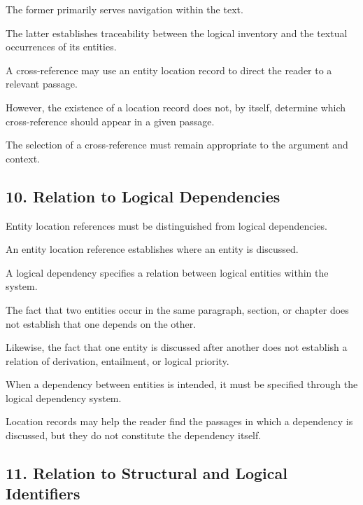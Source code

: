 The former primarily serves
navigation within the text.

The latter establishes
traceability between the
logical inventory and the
textual occurrences of
its entities.

A cross-reference may use
an entity location record
to direct the reader to
a relevant passage.

However, the existence
of a location record does
not, by itself, determine
which cross-reference
should appear in a given
passage.

The selection of a cross-reference
must remain appropriate
to the argument and context.


\subsection*{10. Relation to Logical
Dependencies}

Entity location references
must be distinguished from
logical dependencies.

An entity location reference
establishes where an entity
is discussed.

A logical dependency specifies
a relation between logical
entities within the system.

The fact that two entities
occur in the same paragraph,
section, or chapter does
not establish that one
depends on the other.

Likewise, the fact that
one entity is discussed
after another does not
establish a relation of
derivation, entailment,
or logical priority.

When a dependency between
entities is intended,
it must be specified through
the logical dependency
system.

Location records may help
the reader find the passages
in which a dependency is
discussed, but they do not
constitute the dependency
itself.


\subsection*{11. Relation to Structural
and Logical Identifiers}


